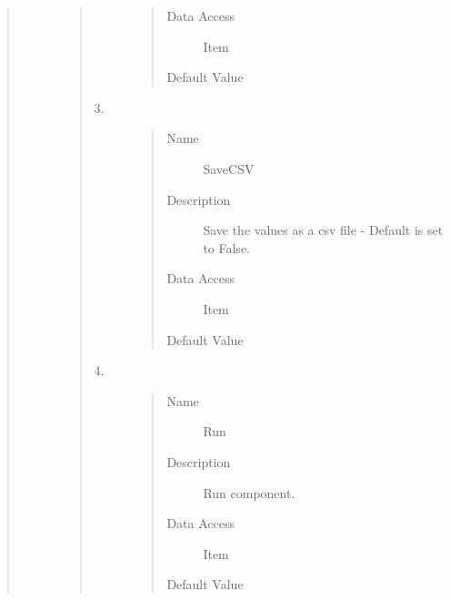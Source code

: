 \documentclass[letterpaper,10pt,english]{sphinxmanual}
\begin{document}
\begin{quote}
\begin{description}
\begin{quote}
\begin{description}
\begin{quote}
\begin{description}
\item[{Data Access}] \leavevmode
Item

\item[{Default Value}] \leavevmode
{}

\end{description}\end{quote}

\item[{3.}] \leavevmode\begin{quote}\begin{description}
\item[{Name}] \leavevmode
SaveCSV

\item[{Description}] \leavevmode
Save the values as a csv file - Default is set to False.

\item[{Data Access}] \leavevmode
Item

\item[{Default Value}] \leavevmode
{}

\end{description}\end{quote}

\item[{4.}] \leavevmode\begin{quote}\begin{description}
\item[{Name}] \leavevmode
Run

\item[{Description}] \leavevmode
Run component.

\item[{Data Access}] \leavevmode
Item

\item[{Default Value}] \leavevmode
{}

\end{description}\end{quote}

\end{description}\end{quote}


\end{description}
\end{quote}
\end{document}
